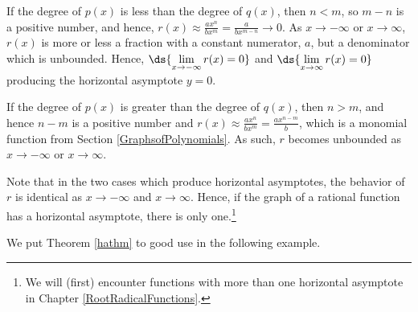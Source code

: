 \documentclass{ximera}
\begin{document}
If the degree of $p(x)$ is less than the degree of $q(x)$, then $n < m$, so $m-n$ is a positive number, and hence, $r(x) \approx  \frac{ax^n}{bx^m}  = \frac{a}{bx^{m-n}} \rightarrow 0$.   As $x \rightarrow  -\infty$ or $x \rightarrow \infty$, $r(x)$ is more or less a fraction with a constant numerator, $a$, but a denominator which is unbounded. Hence, $\ds{\lim_{x \rightarrow  -\infty} r(x) = 0}$ and $\ds{\lim_{x \rightarrow  \infty} r(x) = 0}$  producing the horizontal asymptote $y = 0$.   

If the degree of $p(x)$ is greater than the degree of $q(x)$, then $n > m$, and hence $n-m$ is a positive number and $r(x) \approx  \frac{ax^n}{bx^m}  = \frac{ax^{n-m}}{ b}$, which is a monomial function from Section \ref{GraphsofPolynomials}.  As such, $r$ becomes unbounded as $x \rightarrow -\infty$ or $x \rightarrow \infty$.

Note that in the two cases which produce horizontal asymptotes, the behavior of $r$ is identical as $x \rightarrow -\infty$ and $x \rightarrow \infty$.  Hence, if the graph of a rational function has a horizontal asymptote, there is only one.\footnote{We will (first) encounter functions with more than one horizontal asymptote in Chapter \ref{RootRadicalFunctions}.} 

We put Theorem \ref{hathm}  to good use in the following example.
 
\end{document}
